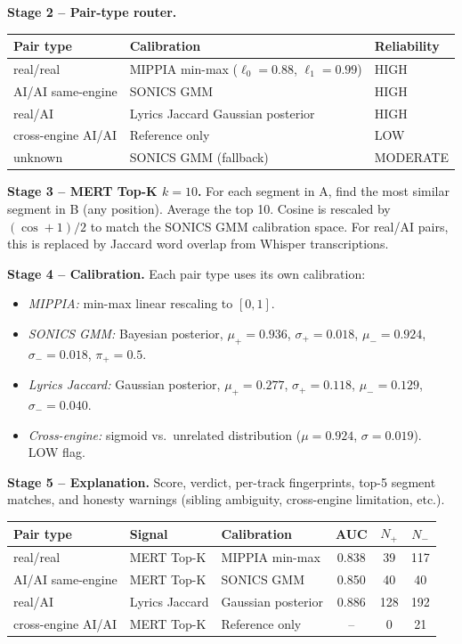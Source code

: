 \documentclass[10pt,a4paper]{article}
\begin{document}
\textbf{Stage 2 -- Pair-type router.}
\begin{center}
\begin{tabular}{lll}
\toprule
Pair type & Calibration & Reliability \\
\midrule
real/real & MIPPIA min-max ($\ell_0=0.88$, $\ell_1=0.99$) & HIGH \\
AI/AI same-engine & SONICS GMM & HIGH \\
real/AI & Lyrics Jaccard Gaussian posterior & HIGH \\
cross-engine AI/AI & Reference only & LOW \\
unknown & SONICS GMM (fallback) & MODERATE \\
\bottomrule
\end{tabular}
\end{center}

\textbf{Stage 3 -- MERT Top-K $k=10$.}
For each segment in A, find the most similar segment in B (any position).
Average the top 10. Cosine is rescaled by $(\cos+1)/2$ to match the
SONICS GMM calibration space. For real/AI pairs, this is replaced by
Jaccard word overlap from Whisper transcriptions.

\textbf{Stage 4 -- Calibration.}
Each pair type uses its own calibration:
\begin{itemize}[nosep]
  \item \textit{MIPPIA:} min-max linear rescaling to $[0, 1]$.
  \item \textit{SONICS GMM:} Bayesian posterior,
    $\mu_+ = 0.936$, $\sigma_+ = 0.018$,
    $\mu_- = 0.924$, $\sigma_- = 0.018$, $\pi_+ = 0.5$.
  \item \textit{Lyrics Jaccard:} Gaussian posterior,
    $\mu_+ = 0.277$, $\sigma_+ = 0.118$,
    $\mu_- = 0.129$, $\sigma_- = 0.040$.
  \item \textit{Cross-engine:} sigmoid vs.\ unrelated distribution
    ($\mu = 0.924$, $\sigma = 0.019$). LOW flag.
\end{itemize}

\textbf{Stage 5 -- Explanation.}
Score, verdict, per-track fingerprints, top-5 segment matches,
and honesty warnings (sibling ambiguity, cross-engine limitation, etc.).

\begin{center}
\begin{tabular}{lllccc}
\toprule
Pair type & Signal & Calibration & AUC & $N_+$ & $N_-$ \\
\midrule
real/real & MERT Top-K & MIPPIA min-max & 0.838 & 39 & 117 \\
AI/AI same-engine & MERT Top-K & SONICS GMM & 0.850 & 40 & 40 \\
real/AI & Lyrics Jaccard & Gaussian posterior & 0.886 & 128 & 192 \\
cross-engine AI/AI & MERT Top-K & Reference only & -- & 0 & 21 \\
\bottomrule
\end{tabular}
\end{center}
\end{document}
